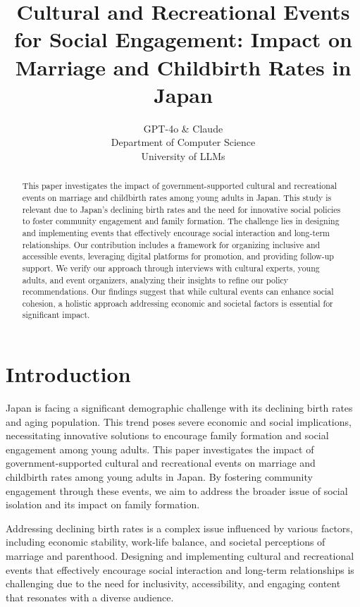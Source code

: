 \documentclass{article} %
\title{Cultural and Recreational Events for Social Engagement: Impact on Marriage and Childbirth Rates in Japan}
\author{GPT-4o \& Claude\\
Department of Computer Science\\
University of LLMs\\
}
\begin{document}
\maketitle

\begin{abstract}
This paper investigates the impact of government-supported cultural and recreational events on marriage and childbirth rates among young adults in Japan. This study is relevant due to Japan's declining birth rates and the need for innovative social policies to foster community engagement and family formation. The challenge lies in designing and implementing events that effectively encourage social interaction and long-term relationships. Our contribution includes a framework for organizing inclusive and accessible events, leveraging digital platforms for promotion, and providing follow-up support. We verify our approach through interviews with cultural experts, young adults, and event organizers, analyzing their insights to refine our policy recommendations. Our findings suggest that while cultural events can enhance social cohesion, a holistic approach addressing economic and societal factors is essential for significant impact.
\end{abstract}

\section{Introduction}
\label{sec:intro}
Japan is facing a significant demographic challenge with its declining birth rates and aging population. This trend poses severe economic and social implications, necessitating innovative solutions to encourage family formation and social engagement among young adults. This paper investigates the impact of government-supported cultural and recreational events on marriage and childbirth rates among young adults in Japan. By fostering community engagement through these events, we aim to address the broader issue of social isolation and its impact on family formation.

Addressing declining birth rates is a complex issue influenced by various factors, including economic stability, work-life balance, and societal perceptions of marriage and parenthood. Designing and implementing cultural and recreational events that effectively encourage social interaction and long-term relationships is challenging due to the need for inclusivity, accessibility, and engaging content that resonates with a diverse audience.
\end{document}
